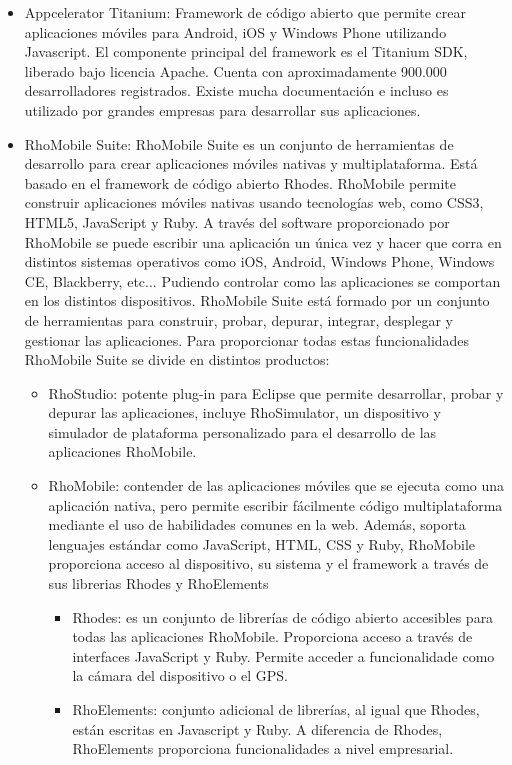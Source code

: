 \documentclass[
10pt, %
a4paper, %
oneside, %
headinclude,footinclude, %
BCOR5mm, %
]{scrartcl}
\begin{document}
\begin{itemize}
	\item Appcelerator Titanium: Framework de código abierto que permite crear aplicaciones móviles para Android, iOS y Windows Phone utilizando Javascript. El componente principal del framework es el Titanium SDK, liberado bajo licencia Apache. Cuenta con aproximadamente 900.000 desarrolladores registrados. Existe mucha documentación e incluso es utilizado por grandes empresas para desarrollar sus aplicaciones.

	\item RhoMobile Suite: RhoMobile Suite es un conjunto de herramientas de desarrollo para crear aplicaciones móviles nativas y multiplataforma. Está basado en el framework de código abierto Rhodes. RhoMobile permite construir aplicaciones móviles nativas usando tecnologías web, como CSS3, HTML5, JavaScript y Ruby. A través del software proporcionado por RhoMobile se puede escribir una aplicación un única vez y hacer que corra en distintos sistemas operativos como iOS, Android, Windows Phone, Windows CE, Blackberry, etc... Pudiendo controlar como las aplicaciones se comportan en los distintos dispositivos. RhoMobile Suite está formado por un conjunto de herramientas para construir, probar, depurar, integrar, desplegar y gestionar las aplicaciones. Para proporcionar todas estas funcionalidades RhoMobile Suite se divide en distintos productos:
	\begin{itemize}
		\item RhoStudio:  potente plug-in para Eclipse que permite desarrollar, probar y depurar las aplicaciones, incluye RhoSimulator, un dispositivo y simulador de plataforma personalizado para el desarrollo de las aplicaciones RhoMobile.

		\item RhoMobile: contender de las aplicaciones móviles que se ejecuta como una aplicación nativa, pero permite escribir fácilmente código multiplataforma mediante el uso de habilidades comunes en la web. Además, soporta lenguajes estándar como JavaScript, HTML, CSS y Ruby, RhoMobile proporciona acceso al dispositivo, su sistema y el framework a través de sus librerias Rhodes y RhoElements
		\begin{itemize}
			\item Rhodes: es un conjunto de librerías de código abierto accesibles para todas las aplicaciones RhoMobile. Proporciona acceso a través de interfaces JavaScript y Ruby. Permite acceder a funcionalidade como la cámara del dispositivo o el GPS.
			\item RhoElements: conjunto adicional de librerías, al igual que Rhodes, están escritas en Javascript y Ruby. A diferencia de Rhodes, RhoElements proporciona funcionalidades a nivel empresarial.
		\end{itemize}


\end{itemize}
\end{itemize}
\end{document}
